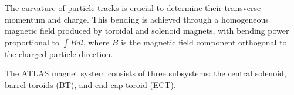\begin{comment}
As well as in the barrel toroid, it has a $4.1\,$T magnetic field on the superconductor.
 For the end-cap toroid, the $\int B dl \in [4,\, 8]\,$ Tm in the pseudorapidity range $1.6 <|\eta| < 2.7$~\cite{CERN-LHCC-97-018}.
 In the transition region where the end-cap and barrel toroids overlap ($1.4 <|\eta| <1.6$), the bending power is lower.
 Each end-cap magnet (Figure~\ref{fig:Chap2:ATLAS:Magnet:EndCapToroid}) has a diameter $10.7\;$m and weights $240\,$tonnes~\cite{CERN-LHCC-97-018, ATLAS_Web_Detectors}.
 \begin{figure}
	\centering
	\texttt{[image: Chapter2/ATLAS\_Magnets\_EndCap]}
	\caption{One of the two end-cap toroidal magnets. Each is made by eight superconducting coils with a magnetic field peaking at $4.1\,$T.}
	\label{fig:Chap2:ATLAS:Magnet:EndCapToroid}
\end{figure}
\end{comment}

The curvature of particle tracks is crucial to determine their transverse momentum and charge. 
This bending is achieved through a homogeneous magnetic field produced by toroidal and solenoid 
magnets, with bending power proportional to $\int B dl$, where $B$ is the magnetic field component 
orthogonal to the charged-particle direction.

The ATLAS magnet system consists of three subsystems: the central solenoid, 
barrel toroids (BT), and end-cap toroid (ECT).

